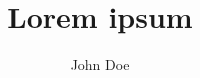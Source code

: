 \documentclass{article}
\title{Lorem ipsum}
\author{John Doe}
\begin{document}
\maketitle
\nocite{*}
\printbibliography
\end{document}
